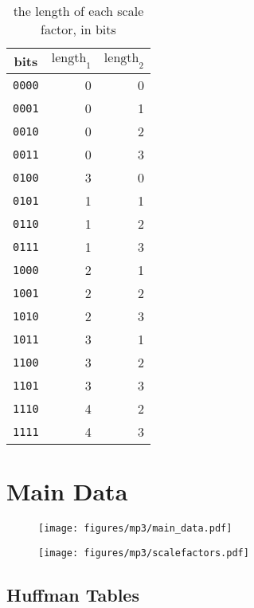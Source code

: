 \documentclass[letter]{scrbook}
\begin{document}
\begin{table}[h]
\begin{tabular}{|c|r|r|}
\hline
bits & $\text{length}_1$ & $\text{length}_2$ \\
\hline
\texttt{0000} & 0 & 0 \\
\texttt{0001} & 0 & 1 \\
\texttt{0010} & 0 & 2 \\
\texttt{0011} & 0 & 3 \\
\texttt{0100} & 3 & 0 \\
\texttt{0101} & 1 & 1 \\
\texttt{0110} & 1 & 2 \\
\texttt{0111} & 1 & 3 \\
\texttt{1000} & 2 & 1 \\
\texttt{1001} & 2 & 2 \\
\texttt{1010} & 2 & 3 \\
\texttt{1011} & 3 & 1 \\
\texttt{1100} & 3 & 2 \\
\texttt{1101} & 3 & 3 \\
\texttt{1110} & 4 & 2 \\
\texttt{1111} & 4 & 3 \\
\hline
\end{tabular}
\caption{the length of each scale factor, in bits}
\end{table}

\section{Main Data}

\begin{figure}[h]
\texttt{[image: figures/mp3/main\_data.pdf]}
\end{figure}

\begin{figure}[h]
\texttt{[image: figures/mp3/scalefactors.pdf]}
\end{figure}

\clearpage

\subsection{Huffman Tables}
\end{document}
